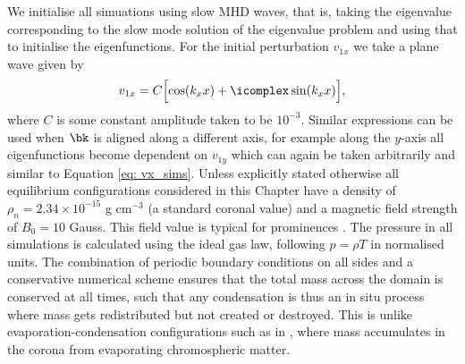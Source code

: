 We initialise all simuations using slow MHD waves, that is, taking the eigenvalue corresponding to the slow mode solution of the eigenvalue problem and using that to initialise the eigenfunctions.
For the initial perturbation $v_{1x}$ we take a plane wave given by
\begin{equation} \label{eq: vx_sims}
  v_{1x} = C\Bigl[\cos(k_x x) + \icomplex \sin(k_x x)\Bigr],
\end{equation}
where $C$ is some constant amplitude taken to be $10^{-3}$. Similar expressions can be used when $\bk$ is aligned along a different axis, for example along the $y$-axis all eigenfunctions become dependent on $v_{1y}$ which can again be taken arbitrarily and similar to Equation \eqref{eq: vx_sims}. Unless explicitly stated otherwise all equilibrium configurations considered in this Chapter have a density of $\rho_n = 2.34 \times 10^{-15}$ g cm$^{-3}$ (a standard coronal value) and a magnetic field strength of $B_0 = 10$ Gauss. This field value is typical for prominences \citep{gibson2018}. The pressure in all simulations is calculated using the ideal gas law, following $p = \rho T$ in normalised units. The combination of periodic boundary conditions on all sides and a conservative numerical scheme ensures that the total mass across the domain is conserved at all times, such that any condensation is thus an in situ process where mass gets redistributed but not created or destroyed. This is unlike evaporation-condensation configurations such as in \citet{xia2016}, where mass accumulates in the corona from evaporating chromospheric matter.


